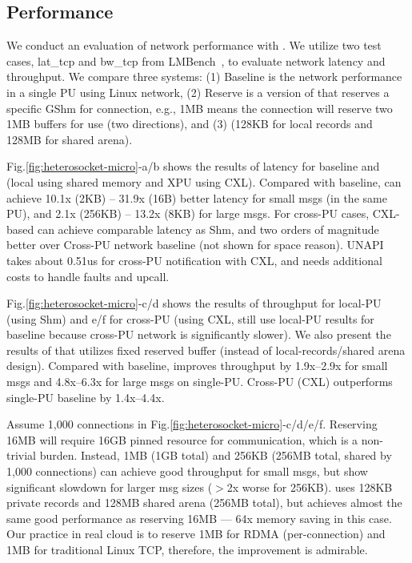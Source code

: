 \subsection{\gsocket Performance}
\label{subs:eval-socket-microbench}

We conduct an evaluation of network performance with \gsocket. %
We utilize two test cases, lat\_tcp and bw\_tcp from LMBench~\cite{mcvoy1996lmbench}, to evaluate network latency and throughput. 
We compare three systems:
(1) Baseline is the network performance in a single PU using Linux network,
(2) Reserve is a version of \os that reserves a specific GShm for connection, e.g., 1MB means the connection will reserve two 1MB buffers for use (two directions),
and (3) \os (128KB for local records and 128MB for shared arena).

Fig.\ref{fig:heterosocket-micro}-a/b shows the results of latency for baseline and \os (local using shared memory and XPU using CXL).
Compared with baseline, \os can achieve 10.1x (2KB) -- 31.9x (16B) better latency for small msgs (in the same PU), and 2.1x (256KB) -- 13.2x (8KB) for large msgs.
For cross-PU cases, CXL-based \os can achieve comparable latency as Shm, and two orders of magnitude better over Cross-PU network baseline (not shown for space reason).
UNAPI takes about 0.51us for cross-PU notification with CXL, and needs additional costs to handle faults and upcall.

Fig.\ref{fig:heterosocket-micro}-c/d shows the results of throughput for local-PU (\os using Shm)
and e/f for cross-PU (\os using CXL, still use local-PU results for baseline because cross-PU network is significantly slower).
We also present the results of \os that utilizes fixed reserved buffer (instead of local-records/shared arena design). %
Compared with baseline, \os improves throughput by 1.9x--2.9x for small msgs and 4.8x--6.3x for large msgs on single-PU.
Cross-PU \os (CXL) outperforms single-PU baseline by 1.4x--4.4x.

Assume 1,000 connections in Fig.\ref{fig:heterosocket-micro}-c/d/e/f.
Reserving 16MB will require 16GB pinned resource for communication, which is a non-trivial burden.
Instead, 1MB (1GB total) and 256KB (256MB total, shared by 1,000 connections) can achieve good throughput for small msgs, but show significant slowdown for larger msg sizes ($>$2x worse for 256KB).
\os uses 128KB private records and 128MB shared arena (256MB total), but achieves almost the same good performance as reserving 16MB --- 64x memory saving in this case.
Our practice in real cloud is to reserve 1MB for RDMA (per-connection) and 1MB for traditional Linux TCP,
therefore, the improvement is admirable.




